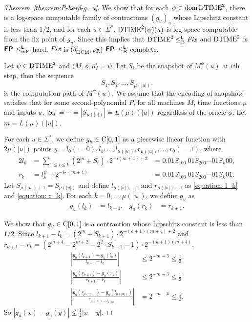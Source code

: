 \documentclass[envcountsame,orivec,oribibl]{llncs}
\begin{document}
\begin{proof}[Theorem~\ref{theorem:P-hard-g_u}]
 We show that for each $\psi \in \mathop{\rm dom} \mathrm{DTIME}^2$,
 there is a log-space computable family of contractions $(g_u)_u$ whose
 Lipschitz constant is less than $1/2$,
 and for each $u \in \Sigma^*$, $\mathrm{DTIME}^2(\psi)(u)$ is log-space 
 computable from the fix point of $g_u$.
 Since this implies that $\mathrm{DTIME}^2 \leq _{\mathrm B} ^{\text{\bfseries \sffamily \upshape L}} \mathit{Fix}$ and $\mathrm{DTIME}^2$
 is $\text{\bfseries \sffamily \upshape FP}$-$\leq _{\mathrm{mF}} ^{\text{\bfseries \sffamily \upshape L}}$-hard, $\mathit{Fix}$ is 
 $(\delta _{\square \mathrm{CM}}^1, \rho _\mathbb R)$-$\text{\bfseries \sffamily \upshape FP}$-$\leq _{\mathrm B} ^{\text{\bfseries \sffamily \upshape L}}$-complete.

 Let $\psi \in \mathrm{DTIME}^2$ and $\langle M, \phi, \bar \mu \rangle = \psi$.
 Let $S_i$ be the snapshot of $M^\phi(u)$ at $i$th step, then the sequence
 \begin{equation}
  S_1, S_2, \dots, S_{\mu(|u|)}.
 \end{equation}
 is the computation path of $M^\phi(u)$.
 We assume that the encoding of snapshots satisfies that 
 for some second-polynomial $P$, for all machines $M$, time functions $\mu$ 
 and inputs $u$, $|S_0| = \cdots = |S_{\mu(|u|)}| = L(\mu)(|u|)$
 regardless of the oracle $\phi$.
 Let $m = L(\mu)(|u|)$.


 For each $u \in \Sigma^*$, we define $g_u \in \mathrm C[0,1]$ as
 a piecewise linear function with $2\mu(|u|)$ points
 $y = l_0 (=0), l_1, \dots, l_{\mu(|u|)}, r_{\mu(|u|)}, \dots, r_0(=1)$,
 where
\begin{alignat}{2}
 \label{equation: l_k}
 l_k 
 &
 = \sum_{1 \le i \le k} (2^m+\overline{S_i}) \cdot 2^{-i(m+4)+2} 
 &
 = 0.01S_100\ 01S_200 \cdots 01S_k00,
 \\
 \label{equation: r_k}
 r_k
 &
 = l^\psi_k + 2^{-i \cdot (m+4)}
 &
 = 0.01S_100\ 01S_200 \cdots 01S_k01.
\end{alignat}
 Let $S_{\mu(|u|)+1} = S_{\mu(|u|)}$ and
 define $l_{\mu(|u|)+1}$ and $r_{\mu(|u|)+1}$ as
 \eqref{equation: l_k} and \eqref{equation: r_k}.
 For each $k = 0, \dots, \mu(|u|)$,
 we define $g_u$ as
 \begin{align}
 g_u(l_k) &= l_{k+1},
 &
 g_u(r_k) &= r_{k+1}.
 \end{align}

 We show that $g_u \in \mathrm C[0,1]$ is a contraction whose Lipschitz constant
 is less than $1/2$.
 Since $l_{k+1} - l_{k} = (2^m+\overline{S_{k+1}}) \cdot 2^{-(k+1)(m+4)+2} $
 and $r_{k+1} - r_{k} = (2^{m+4} - 2^{m+2} - 2^2 \cdot \overline{S_{k+1}} - 1)
 \cdot 2^{-(k+1)(m+4)} $,
\begin{align}
 \left|\frac{g_u(l_{k+1}) - g_u(l_k)}{l_{k+1} - l_k} \right| 
 &
 \le 2^{-m-3} \le \frac 1 2
 \\
 \left|\frac{g_u(r_{k+1}) - g_u(r_k)}{r_{k+1} - r_k} \right| 
 &
 \le 2^{-m-3} \le \frac 1 2
 \\
 \left|\frac{g_u(r_{\mu(|u|)}) - g_u(l_{\mu(|u|)})}{r_{\mu(|u|) - l_{\mu(|u|)}}} \right| 
 &
 = 2^{-m-4} \le \frac 1 2.
\end{align}
 So $|g_u(x) - g_u(y)| \le \frac 1 2 |x-y|$.


\end{proof}
\end{document}
